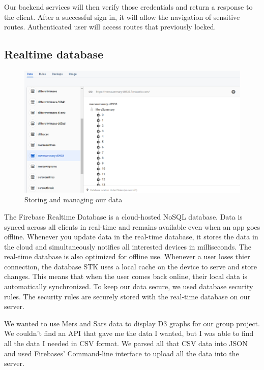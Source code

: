Our backend services will then verify those credentials and return a response to the client.
After a successful sign in, it will allow the navigation of sensitive routes.
Authenticated user will access routes that previously locked.


\subsection{Realtime database}

\begin{figure}[ht]
    \centering
    \includegraphics[scale=0.4]{img/Firebasedb.PNG}
    \caption{Storing and managing our data}
    \label{fig:my_labe4}
\end{figure}


The Firebase Realtime Database is a cloud-hosted NoSQL database.
Data is synced across all clients in real-time and remains available even when an app goes offline.
Whenever you update data in the real-time database, it stores the data in the cloud and simultaneously notifies all interested devices in milliseconds. The real-time database is also optimized for offline use.
Whenever a user loses thier connection, the database STK uses a local cache on the device to serve and store changes. This means that when the user comes back online, their local data is automatically synchronized. To keep our data secure, we used database security rules.
The security rules are securely stored with the real-time database on our server.\cite{fbdb}

\vspace{5mm}

We wanted to use Mers and Sars data to display D3 graphs for our group project.
We couldn’t find an API that gave me the data I wanted, but I was able to find all the data I needed in CSV format. 
We parsed all that CSV data into JSON and used Firebases’ Command-line interface to upload all the data into the server.


